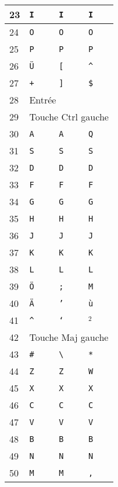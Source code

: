 \begin{longtable}{|l|l|l|l|}
  23 & \texttt{I} & \texttt{I} & \texttt{I} \\ \hline
  24 & \texttt{O} & \texttt{O} & \texttt{O} \\ \hline
  25 & \texttt{P} & \texttt{P} & \texttt{P} \\ \hline
  26 & \texttt{Ü} & \texttt{[} & \texttt{\^} \\ \hline
  27 & \texttt{+} & \texttt{]} & \texttt{\$} \\ \hline
  28 & \multicolumn{3}{|l|}{Entrée} \\ \hline
  29 & \multicolumn{3}{|l|}{Touche Ctrl gauche} \\ \hline
  30 & \texttt{A} & \texttt{A} & \texttt{Q} \\ \hline
  31 & \texttt{S} & \texttt{S} & \texttt{S} \\ \hline
  32 & \texttt{D} & \texttt{D} & \texttt{D} \\ \hline
  33 & \texttt{F} & \texttt{F} & \texttt{F} \\ \hline
  34 & \texttt{G} & \texttt{G} & \texttt{G} \\ \hline
  35 & \texttt{H} & \texttt{H} & \texttt{H} \\ \hline
  36 & \texttt{J} & \texttt{J} & \texttt{J} \\ \hline
  37 & \texttt{K} & \texttt{K} & \texttt{K} \\ \hline
  38 & \texttt{L} & \texttt{L} & \texttt{L} \\ \hline
  39 & \texttt{Ö} & \texttt{;} & \texttt{M} \\ \hline
  40 & \texttt{Ä} & \texttt{'} & \texttt{ù} \\ \hline
  41 & \texttt{\^} & \texttt{`} & $^2$ \\ \hline
  42 & \multicolumn{3}{|l|}{Touche Maj gauche} \\ \hline
  43 & \texttt{\#} & \texttt{\textbackslash} & \texttt{*} \\ \hline
  44 & \texttt{Z} & \texttt{Z} & \texttt{W} \\ \hline
  45 & \texttt{X} & \texttt{X} & \texttt{X} \\ \hline
  46 & \texttt{C} & \texttt{C} & \texttt{C} \\ \hline
  47 & \texttt{V} & \texttt{V} & \texttt{V} \\ \hline
  48 & \texttt{B} & \texttt{B} & \texttt{B} \\ \hline
  49 & \texttt{N} & \texttt{N} & \texttt{N} \\ \hline
  50 & \texttt{M} & \texttt{M} & \texttt{,} \\ \hline

\end{longtable}
